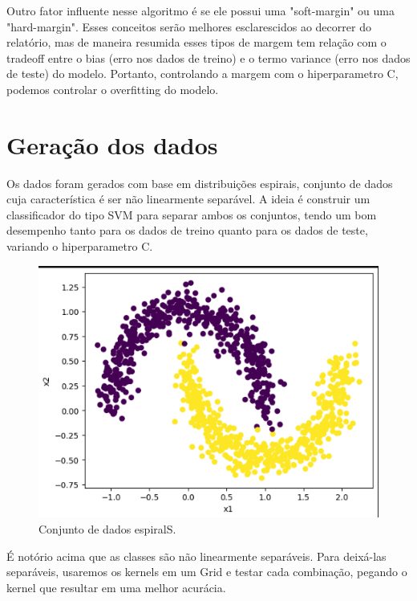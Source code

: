 \documentclass{article} %
\begin{document}
\vspace{1cm}

Outro fator influente nesse algoritmo é se ele possui uma "soft-margin" ou uma "hard-margin". Esses conceitos serão melhores esclarescidos ao decorrer do relatório, mas de maneira resumida esses tipos de margem tem relação com o tradeoff entre o bias (erro nos dados de treino) e o termo variance (erro nos dados de teste) do modelo. Portanto, controlando a margem com o hiperparametro C, podemos controlar o overfitting do modelo.

\section{Geração dos dados}

\vspace{1cm}

Os dados foram gerados com base em distribuições espirais, conjunto de dados cuja característica é ser não linearmente separável. A ideia é construir um classificador do tipo SVM para separar ambos os conjuntos, tendo um bom desempenho tanto para os dados de treino quanto para os dados de teste, variando o hiperparametro C.

\vspace{1cm}

\begin{figure}[h] %
    \centering %
    \includegraphics[width=0.5\linewidth]{spiral_plot.png} %
    \caption{Conjunto de dados espiralS.} %
    \label{fig:exemplo} %
\end{figure}

\vspace{1cm}

É notório acima que as classes são não linearmente separáveis. Para deixá-las separáveis, usaremos os kernels em um Grid e testar cada combinação, pegando o kernel que resultar em uma melhor acurácia.
\end{document}
